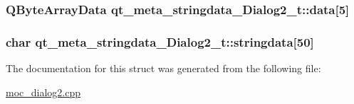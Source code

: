 \subsubsection[{data}]{\setlength{\rightskip}{0pt plus 5cm}Q\+Byte\+Array\+Data qt\+\_\+meta\+\_\+stringdata\+\_\+\+Dialog2\+\_\+t\+::data\mbox{[}5\mbox{]}}\label{structqt__meta__stringdata___dialog2__t_a69b0d4bf9e36d06fbed3232e57c8aa23}
\hypertarget{structqt__meta__stringdata___dialog2__t_a90ba8b45c1f6c6c582696e92e6f99a78}{}
\subsubsection[{stringdata}]{\setlength{\rightskip}{0pt plus 5cm}char qt\+\_\+meta\+\_\+stringdata\+\_\+\+Dialog2\+\_\+t\+::stringdata\mbox{[}50\mbox{]}}\label{structqt__meta__stringdata___dialog2__t_a90ba8b45c1f6c6c582696e92e6f99a78}


The documentation for this struct was generated from the following file\+:\begin{DoxyCompactItemize}
\item 
\hyperlink{moc__dialog2_8cpp}{moc\+\_\+dialog2.\+cpp}\end{DoxyCompactItemize}
